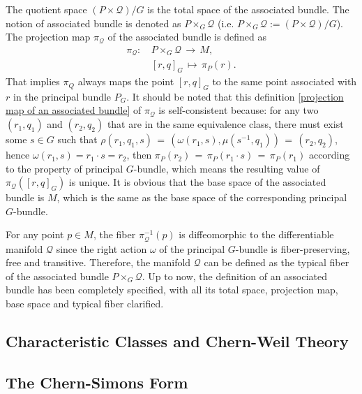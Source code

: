\par The quotient space $\left(P\times\mathcal{Q}\right)/G$ is the total space of the associated bundle. The notion of associated bundle is denoted as $P\times_{G}\mathcal{Q}$ (i.e. $P\times_{G}\mathcal{Q}:=\left(P\times\mathcal{Q}\right)/G$). The projection map $\pi_{\mathcal{Q}}$ of the associated bundle is defined as 
\begin{equation}\label{projection map of an associated bundle}
    \begin{split}
        \pi_{\mathcal{Q}}:\, &P\times_{G}\mathcal{Q}\,\longrightarrow\, M, \\
        &[r,q]_{G}\,\longmapsto\,\pi_{P}\left(r\right).
    \end{split}
\end{equation}
That implies $\pi_{Q}$ always maps the point $[r,q]_{G}$ to the same point associated with $r$ in the principal bundle $P_{G}$. It should be noted that this definition \eqref{projection map of an associated bundle} of $\pi_{\mathcal{Q}}$ is self-consistent because: for any two $\left(r_{1},q_{1}\right)$ and $\left(r_{2},q_{2}\right)$ that are in the same equivalence class, there must exist some $s\in G$ such that $\rho\left(r_{1},q_{1},s\right)\,=\,\left(\omega\left(r_{1},s\right),\mu\left(s^{-1},q_{1}\right)\right)\,=\,\left(r_{2},q_{2}\right)$, hence $\omega\left(r_{1},s\right)=r_{1}\cdot s=r_{2}$, then $\pi_{P}\left(r_{2}\right)\,=\,\pi_{P}\left(r_{1}\cdot s\right)\,=\,\pi_{P}\left(r_{1}\right)$ according to the property of principal $G$-bundle, which means the resulting value of $\pi_{\mathcal{Q}}\left([r,q]_{G}\right)$ is unique. It is obvious that the base space of the associated bundle is $M$, which is the same as the base space of the corresponding principal $G$-bundle. 
\par For any point $p\in M$, the fiber $\pi_{\mathcal{Q}}^{-1}\left(p\right)$ is diffeomorphic to the differentiable manifold $\mathcal{Q}$ since the right action $\omega$ of the principal $G$-bundle is fiber-preserving, free and transitive. Therefore, the manifold $\mathcal{Q}$ can be defined as the typical fiber of the associated bundle $P\times_{G}\mathcal{Q}$. Up to now, the definition of an associated bundle has been completely specified, with all its total space, projection map, base space and typical fiber clarified. 
\par 

\subsection{Characteristic Classes and Chern-Weil Theory}\label{subsec: Characteristic Classes and Chern-Weil Theory} %

\par 


\subsection{The Chern-Simons Form}\label{subsec: Chern-Simons Form} %
